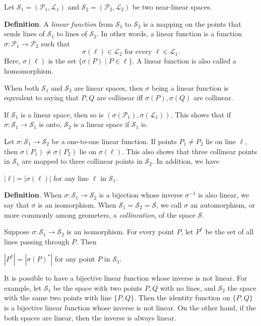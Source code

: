 \documentclass[12pt]{article}
\begin{document}
Let $\mathscr{S}_1=(\mathcal{P}_1,\mathcal{L}_1)$ and $\mathscr{S}_2=(\mathcal{P}_2,\mathcal{L}_2)$ be two near-linear spaces.  

\textbf{Definition}.  A \emph{linear function} from $\mathscr{S}_1$ to $\mathscr{S}_2$ is a mapping on the points that sends lines of $\mathscr{S}_1$ to lines of $\mathscr{S}_2$.  In other words, a linear function is a function $\sigma: \mathcal{P}_1 \to \mathcal{P}_2$ such that $$\sigma(\ell)\in \mathcal{L}_2\mbox{ for every }\ell \in \mathcal{L}_1.$$  Here, $\sigma(\ell)$ is the set $\lbrace \sigma(P)\mid P\in \ell \rbrace$.  A linear function is also called a homomorphism.

When both $\mathscr{S}_1$ and $\mathscr{S}_2$ are linear spaces, then $\sigma$ being a linear function is equvalent to saying that $P,Q$ are collinear iff $\sigma(P),\sigma(Q)$ are collinear.

If $\mathscr{S}_1$ is a linear space, then so is $(\sigma(\mathcal{P}_1),\sigma(\mathcal{L}_1))$.  This shows that if $\sigma: \mathscr{S}_1\to \mathscr{S}_1$ is onto, $\mathscr{S}_2$ is a linear space if $\mathscr{S}_1$ is.

Let $\sigma: \mathscr{S}_1\to \mathscr{S}_2$ be a one-to-one linear function.  If points $P_1\ne P_2$ lie on line $\ell$, then $\sigma(P_1)\ne \sigma(P_2)$ lie on $\sigma(\ell)$.  This also shows that three collinear points in $\mathscr{S}_1$ are mapped to three collinear points in $\mathscr{S}_2$.  In addition, we have 
\begin{center}
$|\ell|=|\sigma(\ell)|$ for any line $\ell$ in $\mathscr{S}_1$.
\end{center}

\textbf{Definition}.  When $\sigma:\mathscr{S}_1\to \mathscr{S}_2$ is a bijection whose inverse $\sigma^{-1}$ is also linear, we say that $\sigma$ is an isomorphism.  When $\mathscr{S}_1=\mathscr{S}_2=\mathscr{S}$, we call $\sigma$ an automorphism, or more commonly among geometers, a \emph{collineation}, of the space $\mathscr{S}$.

Suppose $\sigma:\mathscr{S}_1\to \mathscr{S}_2$ is an isomorphism.  For every point $P$, let $P^*$ be the set of all lines passing through $P$.  Then
\begin{center}
$|P^*|=|\sigma(P)^*|$ for any point $P$ in $\mathscr{S}_1$.
\end{center}

It is possible to have a bijective linear function whose inverse is not linear.  For example, let $\mathscr{S}_1$ be the space with two points $P,Q$ with no lines, and $\mathscr{S}_2$ the space with the same two points with line $\lbrace P,Q\rbrace$.  Then the identity function on $\lbrace P,Q\rbrace$ is a bijective linear function whose inverse is not linear.  On the other hand, if the both spaces are linear, then the inverse is always linear.
\end{document}
